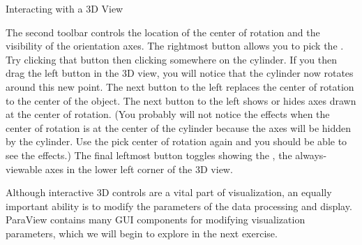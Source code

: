\begin{exercise}{Interacting with a 3D View}

  The second toolbar controls the location of the center of rotation and
  the visibility of the orientation axes.  
  The rightmost button  allows you to pick the
  .  Try clicking that button then clicking
  somewhere on the cylinder.  If you then drag the left button in the 3D
  view, you will notice that the cylinder now rotates around this new
  point.   The next button to the left
   replaces the center of rotation to the center of
  the object.   The next button to the left  shows
  or hides axes drawn at the center of rotation.  (You probably will
  not notice the effects when the center of rotation is at the center of
  the cylinder because the axes will be hidden by the cylinder.  Use the
  pick center of rotation  again and you should be
  able to see the effects.)  The final leftmost button
   toggles showing the
  ,
  the always-viewable axes in the lower left corner of the 3D view.
\end{exercise}

Although interactive 3D controls are a vital part of visualization, an
equally important ability is to modify the parameters of the data
processing and display. ParaView contains many GUI components for modifying
visualization parameters, which we will begin to explore in the next
exercise.

